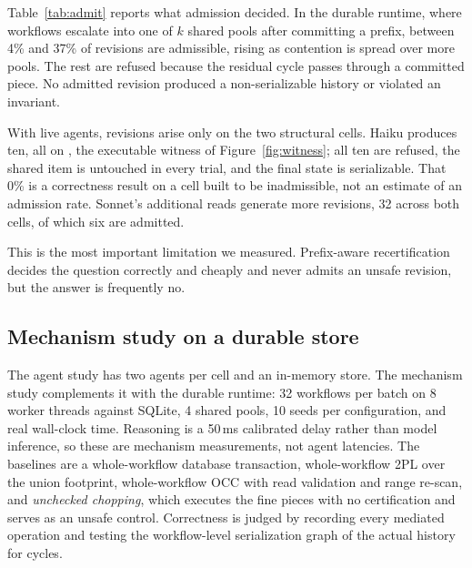 Table~\ref{tab:admit} reports what admission decided. In the durable runtime,
where workflows escalate into one of $k$ shared pools after committing a
prefix, between 4\% and 37\% of revisions are admissible, rising as contention
is spread over more pools. The rest are refused because the residual cycle
passes through a committed piece. No admitted revision produced a
non-serializable history or violated an invariant.

With live agents, revisions arise only on the two structural cells. Haiku
produces ten, all on , the executable witness of
Figure~\ref{fig:witness}; all ten are refused, the shared item is untouched in
every trial, and the final state is serializable. That 0\% is a correctness
result on a cell built to be inadmissible, not an estimate of an admission
rate. Sonnet's additional reads generate more revisions, 32 across both
cells, of which six are admitted.

This is the most important limitation we measured. Prefix-aware
recertification decides the question correctly and cheaply and never admits an
unsafe revision, but the answer is frequently no.

\subsection{Mechanism study on a durable store}
\label{sec:eval:mechanism}

The agent study has two agents per cell and an in-memory store. The mechanism
study complements it with the durable runtime: 32 workflows per batch on 8
worker threads against SQLite, 4 shared pools, 10 seeds per configuration,
and real wall-clock time. Reasoning is a 50\,ms calibrated delay rather than
model inference, so these are mechanism measurements, not agent latencies.
The baselines are a whole-workflow database transaction, whole-workflow 2PL
over the union footprint, whole-workflow OCC with read validation and range
re-scan, and \emph{unchecked chopping}, which executes the fine pieces with no
certification and serves as an unsafe control. Correctness is judged by
recording every mediated operation and testing the workflow-level
serialization graph of the actual history for cycles.

